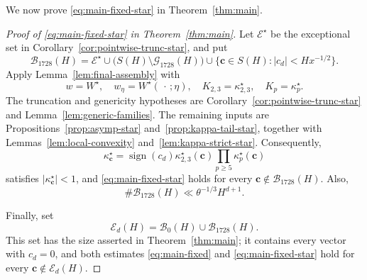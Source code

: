 \documentclass[12pt,reqno]{amsart}
\numberwithin{equation}{section}
\theoremstyle{definition}
\renewcommand{\ge}{\geqslant}
\newcommand{\cc}{\mathbf{c}}
\DeclareMathOperator{\sign}{sign}
\newcommand{\rw}{W}
\begin{document}
We now prove \eqref{eq:main-fixed-star} in Theorem~\ref{thm:main}.
\begin{proof}[Proof of \eqref{eq:main-fixed-star} in Theorem~\ref{thm:main}]
Let $\mathcal E^\star$ be the exceptional set in Corollary~\ref{cor:pointwise-trunc-star}, and put
\begin{equation}\label{eq:def-B1728}
\mathcal B_{1728}(H)
=\mathcal E^\star\cup\bigl(S(H)\setminus\mathcal G_{1728}(H)\bigr)
\cup\{\cc\in S(H):|c_d|<Hx^{-1/2}\}.
\end{equation}
Apply Lemma~\ref{lem:final-assembly} with
\[
w=\rw^\star,\quad
w_\eta=\rw^\star(\,\cdot\,;\eta),\quad
K_{2,3}=\kappa_{2,3}^\star,\quad K_p=\kappa_p^\star.
\]
The truncation and genericity hypotheses are Corollary~\ref{cor:pointwise-trunc-star} and Lemma~\ref{lem:generic-families}.
The remaining inputs are Propositions~\ref{prop:asymp-star} and~\ref{prop:kappa-tail-star}, together with Lemmas~\ref{lem:local-convexity} and~\ref{lem:kappa-strict-star}.
Consequently,
\begin{equation}\label{eq:kappa-c-product-star}
\kappa_\cc^\star
=\sign(c_d)\kappa_{2,3}^\star(\cc)\prod_{p\ge5}\kappa_p^\star(\cc)
\end{equation}
satisfies $|\kappa_\cc^\star|<1$, and \eqref{eq:main-fixed-star} holds for every $\cc\notin\mathcal B_{1728}(H)$.
Also,
\[
\#\mathcal B_{1728}(H)\ll\theta^{-1/3}H^{d+1}.
\]

Finally, set
\[
\mathcal E_d(H)=\mathcal B_0(H)\cup\mathcal B_{1728}(H).
\]
This set has the size asserted in Theorem~\ref{thm:main}; it contains every vector with $c_d=0$, and both estimates \eqref{eq:main-fixed} and \eqref{eq:main-fixed-star} hold for every $\cc\notin\mathcal E_d(H)$.
\end{proof}


\enlargethispage{4\baselineskip}

\end{document}
